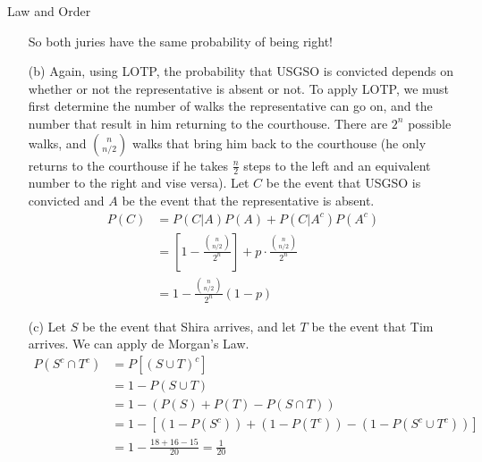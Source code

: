 \documentclass[11pt]{article}
\begin{document}
\begin{exercise}{Law and Order}
\begin{solution}{4}
\begin{enumerate}
    So both juries have the same probability of being right!
    
    \item [(b)] Again, using LOTP, the probability that USGSO is convicted depends on 
    whether or not the representative is absent or not. To apply LOTP, we must first determine
    the number of walks the representative can go on, and the number that result in him returning
    to the courthouse. There are $2^n$ possible walks, and ${n \choose n/2}$ walks that bring him
    back to the courthouse (he only returns to the courthouse if he takes $\frac{n}{2}$ steps to the left and an equivalent number to the right and vise versa). Let $C$ be the event that USGSO is convicted and $A$ be the event that the representative is absent.
    \begin{align}
        P(C) &= P(C |A )P(A) + P(C|A^c)P(A^c)\\
        &= \left[1 - \frac{{n \choose n/2}}{2^n} \right] + p \cdot \frac{{n \choose n/2}}{2^n}\\
        &= 1 - \frac{{n \choose n/2}}{2^n}(1-p)
    \end{align}
    
    \item [(c)] Let $S$ be the event that Shira arrives, and let $T$ be the event that Tim arrives. 
    We can apply de Morgan's Law.
    \begin{align}
        P(S^c \cap T^c) &= P[(S \cup T)^c]\\
        &= 1- P(S \cup T) \\
        &= 1 - (P(S) + P(T)  - P(S \cap T))\\
        &= 1 - [(1- P(S^c)) + (1- P(T^c)) - (1 - P(S^c \cup T^c))]\\
        &= 1- \frac{18+16-15}{20} = \frac{1}{20}
    \end{align}
\end{enumerate}
\end{solution}
\end{exercise}
\end{document}
